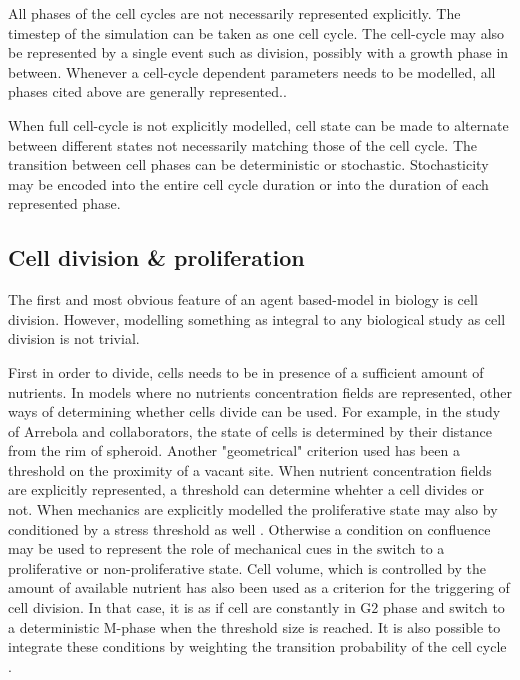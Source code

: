 \documentclass[11pt,a4paper]{article}
\begin{document}
All phases of the cell cycles are not necessarily represented explicitly.\cite{Jagiella2016} The timestep of the simulation can be taken as one cell cycle.\cite{Arrebola2020} The cell-cycle may also be represented by a single event such as division\cite{Bull2020}, possibly with a growth phase in between.\cite{Mao2018} Whenever a cell-cycle dependent parameters needs to be modelled, all phases cited above are generally represented.\cite{Hamis2020}\cite{Tomezak2015}\cite{Cleri2019}\cite{Ghaffarizadeh2017}.

When full cell-cycle is not explicitly modelled, cell state can be made to alternate between different states not necessarily matching those of the cell cycle.\cite{Arrebola2020}\cite{Mao2018}\cite{Jagiella2016}\cite{Bull2020} The transition between cell phases can be deterministic\cite{Tomezak2015}\cite{Cleri2019}\cite{Kempf2005} or stochastic. Stochasticity may be encoded into the entire cell cycle duration\cite{Hamis2020} or into the duration of each represented phase.\cite{Jagiella2016}\cite{Ghaffarizadeh2017}

\subsection{Cell division \& proliferation}
The first and most obvious feature of an agent based-model in biology is cell division. However, modelling something as integral to any biological study as cell division is not trivial.

First in order to divide, cells needs to be in presence of a sufficient amount of nutrients. In models where no nutrients concentration fields are represented, other ways of determining whether cells divide  can be used. For example, in the study of Arrebola and collaborators,  the state of cells is determined by their distance from the rim of spheroid.\cite{Arrebola2020}\cite{Jagiella2016} Another "geometrical" criterion used has been a threshold on the proximity of a vacant site.\cite{Hamis2020} When nutrient concentration fields are explicitly represented, a threshold can determine whehter a cell divides or not.\cite{Cleri2019}\cite{Bull2020} When mechanics are explicitly modelled the proliferative state may also by conditioned by a stress threshold as well \cite{Kempf2005}. Otherwise a condition on confluence may be used to represent the role of mechanical cues in the switch to a proliferative or non-proliferative state.\cite{Cleri2019} Cell volume, which is controlled by the amount of available nutrient has also been used as a criterion for the triggering of cell division.\cite{Mao2018} In that case, it is as if cell are constantly in G2 phase and switch to a deterministic M-phase when the threshold size is reached. It is also possible to integrate these conditions by weighting the transition probability of the cell cycle .\cite{Ghaffarizadeh2017}
\end{document}
